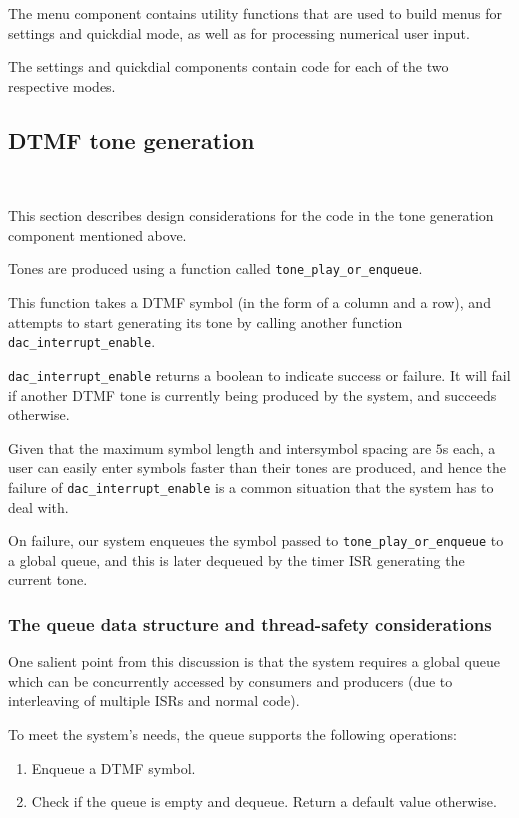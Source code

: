 \documentclass[11pt,a4paper,twocolumn]{scrartcl}
\begin{document}
The menu component contains utility functions that are used to build menus for settings and quickdial mode, as well as for processing numerical user input.

The settings and quickdial components contain code for each of the two respective modes.

\subsection{DTMF tone generation}~\label{dac}

This section describes design considerations for the code in the tone generation component mentioned above.

Tones are produced using a function called \verb!tone_play_or_enqueue!. 

This function takes a DTMF symbol (in the form of a column and a row), and attempts to start generating its tone by calling another function \verb!dac_interrupt_enable!.

\verb!dac_interrupt_enable! returns a boolean to indicate success or failure. It will fail if another DTMF tone is currently being produced by the system, and succeeds otherwise.

Given that the maximum symbol length and intersymbol spacing are $5$s each, a user can easily enter symbols faster than their tones are produced, and hence the failure of \verb!dac_interrupt_enable! is a common situation that the system has to deal with.

On failure, our system enqueues the symbol passed to \verb!tone_play_or_enqueue! to a global queue, and this is later dequeued by the timer ISR generating the current tone.

\subsubsection{The queue data structure and thread-safety considerations}

One salient point from this discussion is that the system requires a global queue which can be concurrently accessed by consumers and producers (due to interleaving of multiple ISRs and normal code).

To meet the system's needs, the queue supports the following operations:
\begin{enumerate}
   \item Enqueue a DTMF symbol.
   \item Check if the queue is empty and dequeue. Return a default value otherwise.
\end{enumerate}
\end{document}
